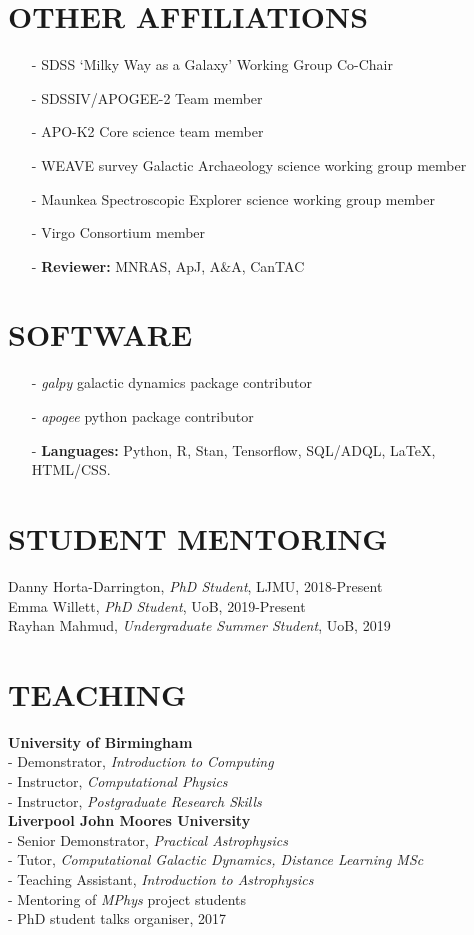 \documentclass[margin]{res}
\begin{document}
\begin{resume}
\section{OTHER AFFILIATIONS}
\begin{itemize}
\item[-] SDSS `Milky Way as a Galaxy' Working Group Co-Chair
\item[-] SDSSIV/APOGEE-2 Team member
\item[-] APO-K2 Core science team member
\item[-] WEAVE survey Galactic Archaeology science working group member
\item[-] Maunkea Spectroscopic Explorer science working group member
\item[-] Virgo Consortium member
\item[-] \textbf{Reviewer:} MNRAS, ApJ, A\&A, CanTAC
\end{itemize}

\section{SOFTWARE}
\begin{itemize}
\item[-] \emph{galpy} galactic dynamics package contributor
\item[-] \emph{apogee} python package contributor
\item[-] \textbf{Languages:} Python, R, Stan, Tensorflow, SQL/ADQL, \LaTeX, HTML/CSS.
\end{itemize}

\section{STUDENT MENTORING}
Danny Horta-Darrington, \emph{PhD Student}, LJMU, 2018-Present\\
Emma Willett, \emph{PhD Student}, UoB, 2019-Present\\
Rayhan Mahmud, \emph{Undergraduate Summer Student}, UoB, 2019

\section{TEACHING}
\textbf{University of Birmingham}\\
- Demonstrator, \emph{Introduction to Computing}\\
- Instructor, \emph{Computational Physics}\\
- Instructor, \emph{Postgraduate Research Skills}\\
\textbf{Liverpool John Moores University}\\
- Senior Demonstrator, \emph{Practical Astrophysics}\\
- Tutor, \emph{Computational Galactic Dynamics, Distance Learning MSc}\\
- Teaching Assistant, \emph{Introduction to Astrophysics}\\
- Mentoring of \emph{MPhys} project students\\
- PhD student talks organiser, 2017


\end{resume}
\end{document}
